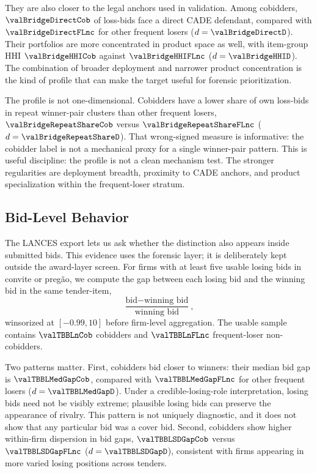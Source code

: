 They are also closer to the legal anchors used in validation.
Among cobidders, $\valBridgeDirectCob$ of loss-bids face a direct
CADE defendant, compared with $\valBridgeDirectFLnc$ for other
frequent losers ($d=\valBridgeDirectD$). Their portfolios are
more concentrated in product space as well, with item-group HHI
$\valBridgeHHICob$ against $\valBridgeHHIFLnc$
($d=\valBridgeHHID$). The combination of broader deployment and
narrower product concentration is the kind of profile that can
make the target useful for forensic prioritization.

The profile is not one-dimensional. Cobidders have a lower share
of own loss-bids in repeat winner-pair clusters than other
frequent losers, $\valBridgeRepeatShareCob$ versus
$\valBridgeRepeatShareFLnc$ ($d=\valBridgeRepeatShareD$). That
wrong-signed measure is informative: the cobidder label is not a
mechanical proxy for a single winner-pair pattern. This is useful
discipline: the profile is not a clean mechanism test. The stronger
regularities are deployment breadth, proximity to CADE anchors,
and product specialization within the frequent-loser stratum.

\subsection{Bid-Level Behavior}
\label{sec:cobidder_bid}

The LANCES export lets us ask whether the distinction also
appears inside submitted bids. This evidence uses the forensic
layer; it is deliberately kept outside the award-layer screen.
For firms with at least five usable losing bids in convite or
preg\~ao, we compute the gap between each losing bid and the
winning bid in the same tender-item,
\[
  \frac{\text{bid}-\text{winning bid}}{\text{winning bid}},
\]
winsorized at $[-0.99,10]$ before firm-level aggregation. The
usable sample contains $\valTBBLnCob$ cobidders and
$\valTBBLnFLnc$ frequent-loser non-cobidders.

Two patterns matter. First, cobidders bid closer to winners:
their median bid gap is $\valTBBLMedGapCob$, compared with
$\valTBBLMedGapFLnc$ for other frequent losers
($d=\valTBBLMedGapD$). Under a credible-losing-role
interpretation, losing bids need not be visibly extreme;
plausible losing bids can preserve the appearance of rivalry.
This pattern is not uniquely diagnostic, and it does not show
that any particular bid was a cover bid. Second, cobidders show
higher within-firm dispersion in bid gaps,
$\valTBBLSDGapCob$ versus $\valTBBLSDGapFLnc$
($d=\valTBBLSDGapD$), consistent with firms appearing in more
varied losing positions across tenders.

